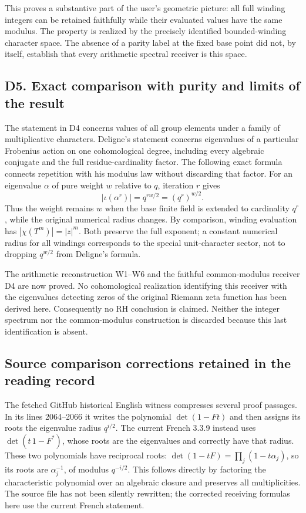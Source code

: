 \documentclass[
  11pt,
]{article}
\begin{document}
This proves a substantive part of the user's geometric picture: all full
winding integers can be retained faithfully while their evaluated values
have the same modulus. The property is realized by the precisely
identified bounded-winding character space. The absence of a parity
label at the fixed base point did not, by itself, establish that every
arithmetic spectral receiver is this space.

\subsection{D5. Exact comparison with purity and limits of the
result}\label{d5.-exact-comparison-with-purity-and-limits-of-the-result}

The statement in D4 concerns values of all group elements under a family
of multiplicative characters. Deligne's statement concerns eigenvalues
of a particular Frobenius action on one cohomological degree, including
every algebraic conjugate and the full residue-cardinality factor. The
following exact formula connects repetition with his modulus law without
discarding that factor. For an eigenvalue \(\alpha\) of pure weight
\(w\) relative to \(q\), iteration \(r\) gives \[
|\iota(\alpha^r)|=q^{rw/2}=(q^r)^{w/2}.
\] Thus the weight remains \(w\) when the base finite field is extended
to cardinality \(q^r\), while the original numerical radius changes. By
comparison, winding evaluation has \(|\chi(T^m)|=|z|^m\). Both preserve
the full exponent; a constant numerical radius for all windings
corresponds to the special unit-character sector, not to dropping
\(q^{w/2}\) from Deligne's formula.

The arithmetic reconstruction W1--W6 and the faithful common-modulus
receiver D4 are now proved. No cohomological realization identifying
this receiver with the eigenvalues detecting zeros of the original
Riemann zeta function has been derived here. Consequently no RH
conclusion is claimed. Neither the integer spectrum nor the
common-modulus construction is discarded because this last
identification is absent.

\subsection{Source comparison corrections retained in the reading
record}\label{source-comparison-corrections-retained-in-the-reading-record}

The fetched GitHub historical English witness compresses several proof
passages. In its lines 2064--2066 it writes the polynomial
\(\det(1-Ft)\) and then assigns its roots the eigenvalue radius
\(q^{i/2}\). The current French 3.3.9 instead uses \(\det(t\,1-F^*)\),
whose roots are the eigenvalues and correctly have that radius. These
two polynomials have reciprocal roots:
\(\det(1-tF)=\prod_j(1-t\alpha_j)\), so its roots are \(\alpha_j^{-1}\),
of modulus \(q^{-i/2}\). This follows directly by factoring the
characteristic polynomial over an algebraic closure and preserves all
multiplicities. The source file has not been silently rewritten; the
corrected receiving formulas here use the current French statement.
\end{document}

